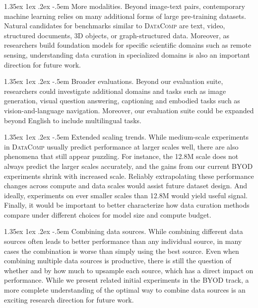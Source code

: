 \documentclass[dvipsnames,11pt]{article}
\makeatletter
\renewcommand\paragraph{\@startsection{paragraph}{4}{\z@}                                     {1.35ex \@plus1ex \@minus.2ex}                                {-.5em}
{\normalfont\normalsize\bfseries}}
\newcommand{\datanet}{\textsc{DataComp}\xspace}
\newcommand{\byod}{\textsc{BYOD}\xspace}
\makeatother
\begin{document}
\paragraph{More modalities.} Beyond image-text pairs, contemporary machine learning relies on many additional forms of large pre-training datasets.
Natural candidates for benchmarks similar to \datanet are text, video, structured documents, 3D objects, or graph-structured data.
Moreover, as researchers build foundation models for specific scientific domains such as remote sensing, understanding data curation in specialized domains is also an important direction for future work.

\paragraph{Broader evaluations.} Beyond our evaluation suite, researchers could investigate additional domains and tasks such as image generation, visual question answering, captioning and embodied tasks such as vision-and-language navigation. Moreover, our evaluation suite could be expanded beyond English to include multilingual tasks.


\paragraph{Extended scaling trends.} While medium-scale experiments in \datanet usually predict performance at larger scales well, there are also phenomena that still appear puzzling.
For instance, the 12.8M scale does not always predict the larger scales accurately, and the gains from our current BYOD experiments shrink with increased scale.
Reliably extrapolating these performance changes across compute and data scales would assist future dataset design.
And ideally, experiments on ever smaller scales than 12.8M would yield useful signal.
Finally, it would be important to better characterize how data curation methods compare under different choices for model size and compute budget.

\paragraph{Combining data sources.} While combining different data sources often leads to better performance than any individual source, in many cases the combination is worse than simply using the best source. Even when combining multiple data sources is productive, there is still the question of whether and by how much to upsample each source, which has a direct impact on performance. While we present related initial experiments in the \byod track, a more complete understanding of the optimal way to combine data sources is an exciting research direction for future work.
\end{document}

